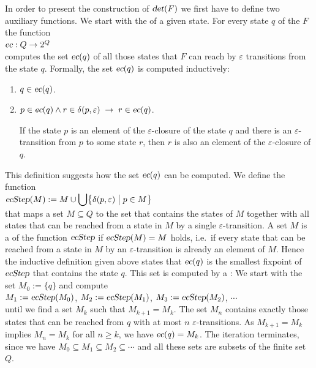 In order to present the construction of $\textsl{det}(F)$ we first have to define two auxiliary functions.
We start with the   of a given state.  For every state
$q$ of the  $F$ the function
\\[0.2cm]
\hspace*{1.3cm}
$\textsl{ec}: Q \rightarrow 2^Q$
\\[0.2cm]
computes the set $\textsl{ec}(q)$ of all those states that $F$ can reach by $\varepsilon$
transitions from the state $q$.   Formally, the set $\textsl{ec}(q)$ is computed inductively:
\begin{enumerate}
\item[B.C.:] $q \in \textsl{ec}(q)$.
\item[I.S.:] $p \in \textsl{ec}(q) \wedge r \in \delta(p, \varepsilon) \;\rightarrow\; r \in \textsl{ec}(q)$.
 
             If the state $p$ is an element of the $\varepsilon$-closure of the state $q$ and there is an
             $\varepsilon$-transition from $p$ to some state $r$, then $r$ is also an element
             of the $\varepsilon$-closure of $q$.
\end{enumerate}
This definition suggests how the set $\textsl{ec}(q)$ can be computed.  We define the function
\\[0.2cm]
\hspace*{1.3cm}
$\displaystyle \textsl{ecStep}(M) := M \cup \bigcup \bigl\{ \delta(p, \varepsilon) \bigm| p \in M \bigr\}$
\\[0.2cm]
that maps a set $M \subseteq Q$ to the set that contains the states of $M$ together with all states that can be
reached from a state in $M$ by a single $\varepsilon$-transition.  A set $M$ is a  of
the function $\textsl{ecStep}$ if $\textsl{ecStep}(M) = M$ holds, i.e.~if every state that can be reached from a
state in $M$ by an $\varepsilon$-transition is already an element of $M$.  Hence the inductive definition given
above states that $\textsl{ec}(q)$ is the smallest fixpoint of $\textsl{ecStep}$ that contains the state $q$.  This
set is computed by a :  We start with the set
$M_0 := \{ q \}$ and compute
\\[0.2cm]
\hspace*{1.3cm}
$M_1 := \textsl{ecStep}(M_0)$, \quad $M_2 := \textsl{ecStep}(M_1)$, \quad $M_3 := \textsl{ecStep}(M_2)$, \quad
$\cdots$
\\[0.2cm]
until we find a set $M_k$ such that $M_{k+1} = M_k$.  The set $M_n$ contains exactly those states that can be
reached from $q$ with at most $n$ $\varepsilon$-transitions.  As $M_{k+1} = M_k$ implies $M_n = M_k$ for all
$n \geq k$, we have $\textsl{ec}(q) = M_k$.  The iteration terminates, since we have
$M_0 \subseteq M_1 \subseteq M_2 \subseteq \cdots$ and all these sets are subsets of the finite set $Q$.


